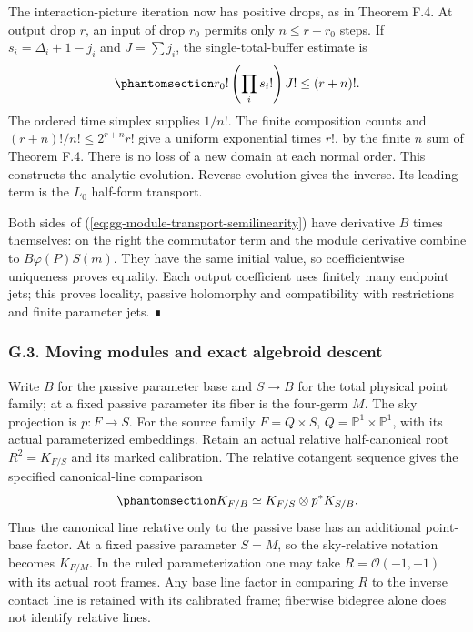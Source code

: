 \documentclass[
  english,
  11pt,
  reqno]{amsart}
\begin{document}
The interaction-picture iteration now has positive drops, as in Theorem
F.4. At output drop \(r\), an input of drop \(r_0\) permits only
\(n\le r-r_0\) steps. If \(s_i=\Delta_i+1-j_i\) and \(J=\sum j_i\), the
single-total-buffer estimate is
\begin{equation}\protect\phantomsection\label{eq:gg-module-transport-factorial-budget}{
 r_0!\left(\prod_i s_i!\right)J!\le(r+n)!.
}\end{equation} The ordered time simplex supplies \(1/n!\). The finite
composition counts and \((r+n)!/n!\le2^{r+n}r!\) give a uniform
exponential times \(r!\), by the finite \(n\) sum of Theorem F.4. There
is no loss of a new domain at each normal order. This constructs the
analytic evolution. Reverse evolution gives the inverse. Its leading
term is the \(L_0\) half-form transport.

Both sides of (\ref{eq:gg-module-transport-semilinearity}) have
derivative \(B\) times themselves: on the right the commutator term and
the module derivative combine to \(B\varphi(P)S(m)\). They have the same
initial value, so coefficientwise uniqueness proves equality. Each
output coefficient uses finitely many endpoint jets; this proves
locality, passive holomorphy and compatibility with restrictions and
finite parameter jets. ∎

\protect{}\label{sec:gg-module-relative-descent}

\subsubsection{G.3. Moving modules and exact algebroid
descent}\label{g.3.-moving-modules-and-exact-algebroid-descent}

Write \(B\) for the passive parameter base and \(S\to B\) for the total
physical point family; at a fixed passive parameter its fiber is the
four-germ \(M\). The sky projection is \(p:F\to S\). For the source
family \(F=Q\times S\), \(Q=\mathbb P^1\times\mathbb P^1\), with its
actual parameterized embeddings. Retain an actual relative
half-canonical root \(R^2=K_{F/S}\) and its marked calibration. The
relative cotangent sequence gives the specified canonical-line
comparison
\begin{equation}\protect\phantomsection\label{eq:gg-module-relative-canonical-base}{
 K_{F/B}\simeq K_{F/S}\otimes p^*K_{S/B}.
}\end{equation} Thus the canonical line relative only to the passive
base has an additional point-base factor. At a fixed passive parameter
\(S=M\), so the sky-relative notation becomes \(K_{F/M}\). In the ruled
parameterization one may take \(R=\mathcal O(-1,-1)\) with its actual
root frames. Any base line factor in comparing \(R\) to the inverse
contact line is retained with its calibrated frame; fiberwise bidegree
alone does not identify relative lines.
\end{document}
